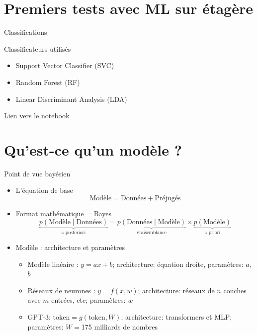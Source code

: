 \documentclass[presentation, aspectratio=169]{beamer}
\begin{document}
\section{Premiers tests avec ML sur étagère}

\begin{frame}{Classifications}
  \begin{block}{Classificateurs utilisés}
    \begin{itemize}
    \item Support Vector Classifier (SVC)
    \item Random Forest (RF)
    \item Linear Discriminant Analysis (LDA)
    \end{itemize}
  \end{block}

  Lien vers le notebook
\end{frame}


\section{Qu'est-ce qu'un modèle ?}

\begin{frame}{Point de vue bayésien}
  \begin{itemize}
  \item L'équation de base
    \begin{equation*}
      \text{Modèle} = \text{Données} + \text{Préjugés}
    \end{equation*}
  \item Format mathématique = Bayes
    \begin{equation*}
      \underbrace{p(\text{Modèle}\mid \text{Données})}_{\text{a posteriori}}
        = \underbrace{p(\text{Données}\mid\text{Modèle})}_{\text{vraisemblance}}
        \times
        \underbrace{p(\text{Modèle})}_{\text{a priori}}
    \end{equation*}
  \item Modèle : architecture et paramètres
    \begin{itemize}
    \item Modèle linéaire : $y = ax+b$; architecture:
      équation droite, paramètres: $a$, $b$
    \item Réseaux de neurones : $y = f(x, w)$; architecture: réseaux
      de $n$ couches avec $m$ entrées, etc; paramètres: $w$
    \item GPT-3: $\text{token} = g(\text{token}, W)$; architecture:
      transformers et MLP; paramètres: $W = $175 milliards de nombres
    \end{itemize}
  \end{itemize}
\end{frame}
\end{document}
